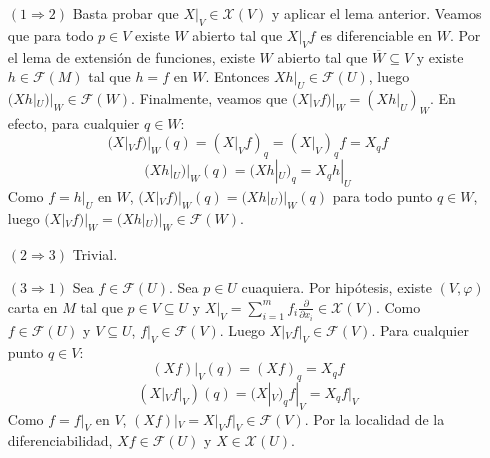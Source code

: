 \documentclass[Cursovd_portada.tex]{subfiles}
\begin{document}
\begin{dem}\mbox{}
\begin{enumerate}
\item[$(1 \Rightarrow 2)$] Basta probar que $X|_V \in \mathcal{X}(V)$ y aplicar el lema anterior. Veamos que para todo $p \in V$ existe $W$ abierto tal que $X|_V f$ es diferenciable en $W$. Por el lema de extensión de funciones, existe $W$ abierto tal que $\overline{W} \subseteq V$ y existe $h \in \mathcal{F}(M)$ tal que $h = f$ en $W$. Entonces $X h|_U \in \mathcal{F}(U)$, luego $(X h|_U)|_W \in \mathcal{F}(W)$. Finalmente, veamos que $(X|_V f)|_W = (X h |_U)_W$. En efecto, para cualquier $q \in W$:
\[ (X|_V f)|_W(q) = (X|_V f)_q = (X|_V)_q f = X_q f \]
\[ (X h|_U)|_W(q) = (X h|_U)_q = X_q h|_U \]
Como $f = h|_U$ en $W$, $(X|_V f)|_W(q) = (X h|_U)|_W(q)$ para todo punto $q \in W$, luego $(X|_V f)|_W = (X h|_U)|_W \in \mathcal{F}(W)$.
\item[$(2 \Rightarrow 3)$] Trivial.
\item[$(3 \Rightarrow 1)$] Sea $f \in \mathcal{F}(U)$. Sea $p \in U$ cuaquiera. Por hipótesis, existe $(V,φ)$ carta en $M$ tal que $p \in V \subseteq U$ y $X|_V = \sum_{i=1}^m f_i \frac{\partial}{\partial x_i} \in \mathcal{X}(V)$. Como $f \in \mathcal{F}(U)$ y $V \subseteq U$, $f|_V \in \mathcal{F}(V)$. Luego $X|_V f|_V \in \mathcal{F}(V)$. Para cualquier punto $q \in V$:
\[ (X f)|_V (q) = (X f)_q = X_q f \]
\[ (X|_V f|_V) (q) = (X|_V)_q f|_V = X_q f|_V \]
Como $f = f|_V$ en $V$, $(X f)|_V = X|_V f|_V \in \mathcal{F}(V)$. Por la localidad de la diferenciabilidad, $X f \in \mathcal{F}(U)$ y $X \in \mathcal{X}(U)$.
\end{enumerate}
\end{dem}

\
\end{document}
